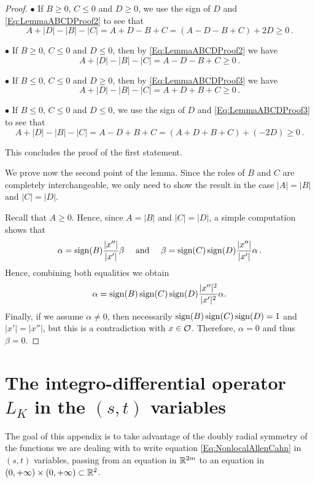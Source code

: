 \begin{proof}
$\bullet$ If $B \geq 0$, $C \leq 0$ and $D \geq 0$, we use the sign of $D$ and \eqref{Eq:LemmaABCDProof2} to
see that
$$
A + |D| - |B| - |C| = A + D - B + C =  (A - D - B + C) + 2D \geq 0\,.
$$

$\bullet$ If $B \geq 0$, $C \leq 0$ and $D \leq 0$, then by \eqref{Eq:LemmaABCDProof2} we have
$$
A + |D| - |B| - |C| = A - D - B + C \geq 0\,.
$$

$\bullet$ If $B \leq 0$, $C \leq 0$ and $D \geq 0$, then by \eqref{Eq:LemmaABCDProof3} we have
$$
A + |D| - |B| - |C| = A + D + B + C \geq 0\,.
$$

$\bullet$ If $B \leq 0$, $C \leq 0$ and $D \leq 0$, we use the sign of $D$ and \eqref{Eq:LemmaABCDProof3} to see that
$$
A + |D| - |B| - |C| = A - D + B + C =  (A + D + B + C) + (-2D) \geq 0\,.
$$

This concludes the proof of the first statement.

We prove now the second point of the lemma. Since the roles of $B$ and $C$ are completely
interchangeable, we only need to show the result in the case $|A| = |B|$ and $|C| = |D|$.

Recall that $A \geq 0$. Hence, since $A = |B|$ and $|C| = |D|$, a simple computation shows that
$$
\alpha = \operatorname{sign} (B) \dfrac{|x''|}{|x'|}\beta \quad \textrm{ and } \quad
\beta = \operatorname{sign} (C) \operatorname{sign}(D) \dfrac{|x''|}{|x'|} \alpha \,.
$$
Hence, combining both equalities we obtain
$$
\alpha = \operatorname{sign} (B) \operatorname{sign} (C) \operatorname{sign}(D) \dfrac{|x''|^2}{|x'|^2} \alpha.
$$
Finally, if we assume $\alpha \neq 0$, then necessarily $\operatorname{sign} (B) \operatorname{sign} (C) \operatorname{sign}(D)=1$ and $|x'|
= |x''|$, but this is a contradiction with $x\in \mathcal{O}$. Therefore, $\alpha = 0$ and thus $\beta =
0$.
\end{proof}








\section{The integro-differential operator $L_K$ in the $(s,t)$ variables}
\label{Sec:stcomputations}

The goal of this appendix is to take advantage of the doubly radial symmetry of the functions we
are dealing with to write equation \eqref{Eq:NonlocalAllenCahn} in $(s,t)$ variables, passing from
an equation in $\mathbb{R}^{2m}$ to an equation in $(0,+\infty)\times (0,+\infty)\subset \mathbb{R}^2$.

